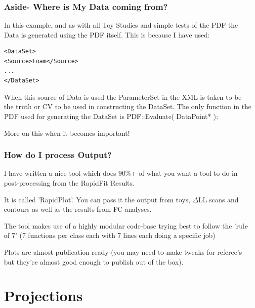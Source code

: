 \documentclass{beamer}
\begin{document}
\begin{frame}[fragile]
\frametitle{Aside- Where is My Data coming from?}
In this example, and as with all Toy Studies and simple tests of the PDF the Data is generated using the PDF itself.\newline\newline
This is because I have used:
\tiny
\begin{lstlisting}[tabsize=8]
<DataSet>
<Source>Foam</Source>
...
</DataSet>
\end{lstlisting}

\normalsize When this source of Data is used the ParameterSet in the XML is taken to be the truth or CV to be used in constructing the DataSet.\newline\newline
The only function in the PDF used for generating the DataSet is PDF::Evaluate( DataPoint* );\newline

More on this when it becomes important!
\end{frame}

\begin{frame}
\frametitle{How do I process Output?}
I have written a nice tool which does 90\%+ of what you want a tool to do in post-processing from the RapidFit Results.\newline

It is called 'RapidPlot'. You can pass it the output from toys, $\Delta$LL scans and contours as well as the results from FC analyses.\newline

The tool makes use of a highly modular code-base trying best to follow the 'rule of 7' (7 functions per class each with 7 lines each doing a specific job)\newline

Plots are almost publication ready (you may need to make tweaks for referee's but they're almost good enough to publish out of the box).
\end{frame}


\section{Projections}
\end{document}
